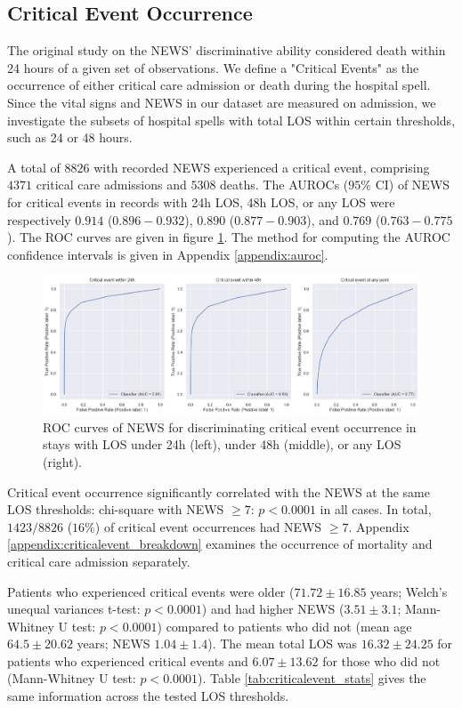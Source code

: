 \documentclass[10pt,journal, compsoc]{IEEEtran}
\begin{document}
\subsection{Critical Event Occurrence} The original study on the NEWS' discriminative ability considered death within 24 hours of a given set of observations. We define a "Critical Events" as the occurrence of either critical care admission or death during the hospital spell. Since the vital signs and NEWS in our dataset are measured on admission, we investigate the subsets of hospital spells with total LOS within certain thresholds, such as 24 or 48 hours.

A total of $8826$ with recorded NEWS experienced a critical event, comprising $4371$ critical care admissions and $5308$ deaths. The AUROCs ($95\%$ CI) of NEWS for critical events in records with 24h LOS, 48h LOS, or any LOS were respectively $0.914$ ($0.896-0.932$), $0.890$ ($0.877-0.903$), and $0.769$ ($0.763-0.775$). The ROC curves are given in figure \ref{fig:criticalevent_roc}. The method for computing the AUROC confidence intervals is given in Appendix \ref{appendix:auroc}.

\begin{figure}[htbp]
    \centering
    \includegraphics[width=\textwidth]{img/critical_event_roc.png}
    \caption{ROC curves of NEWS for discriminating critical event occurrence in stays with LOS under 24h (left), under 48h (middle), or any LOS (right).}
    \label{fig:criticalevent_roc}
\end{figure}

Critical event occurrence significantly correlated with the NEWS at the same LOS thresholds: chi-square with NEWS $\geq 7$: $p < 0.0001$ in all cases. In total, $1423/8826$ ($16\%$) of critical event occurrences had NEWS $\geq 7$. Appendix \ref{appendix:criticalevent_breakdown} examines the occurrence of mortality and critical care admission separately.

Patients who experienced critical events were older ($71.72 \pm 16.85$ years; Welch's unequal variances t-test: $p < 0.0001$) and had higher NEWS ($3.51 \pm 3.1$; Mann-Whitney U test: $p < 0.0001$) compared to patients who did not (mean age $64.5 \pm 20.62$ years; NEWS $1.04 \pm 1.4$). The mean total LOS was $16.32 \pm 24.25$ for patients who experienced critical events and $6.07 \pm 13.62$ for those who did not (Mann-Whitney U test: $p < 0.0001$). Table \ref{tab:criticalevent_stats} gives the same information across the tested LOS thresholds.
\end{document}
